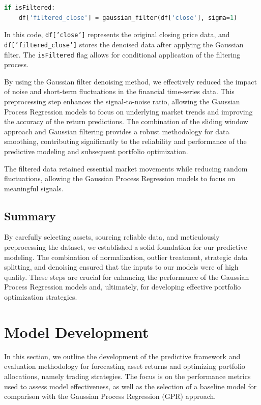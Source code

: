 \begin{lstlisting}[language=Python]
if isFiltered:
    df['filtered_close'] = gaussian_filter(df['close'], sigma=1)
\end{lstlisting}

In this code, \texttt{df['close']} represents the original closing price data, and \texttt{df['filtered\_close']} stores the denoised data after applying the Gaussian filter. The \texttt{isFiltered} flag allows for conditional application of the filtering process.

By using the Gaussian filter denoising method, we effectively reduced the impact of noise and short-term fluctuations in the financial time-series data. This preprocessing step enhances the signal-to-noise ratio, allowing the Gaussian Process Regression models to focus on underlying market trends and improving the accuracy of the return predictions. The combination of the sliding window approach and Gaussian filtering provides a robust methodology for data smoothing, contributing significantly to the reliability and performance of the predictive modeling and subsequent portfolio optimization.

The filtered data retained essential market movements while reducing random fluctuations, allowing the Gaussian Process Regression models to focus on meaningful signals.


\subsection{Summary}

By carefully selecting assets, sourcing reliable data, and meticulously preprocessing the dataset, we established a solid foundation for our predictive modeling. The combination of normalization, outlier treatment, strategic data splitting, and denoising ensured that the inputs to our models were of high quality. These steps are crucial for enhancing the performance of the Gaussian Process Regression models and, ultimately, for developing effective portfolio optimization strategies.



\section{Model Development}
In this section, we outline the development of the predictive framework and evaluation methodology for forecasting asset returns and optimizing portfolio allocations, namely trading strategies. The focus is on the performance metrics used to assess model effectiveness, as well as the selection of a baseline model for comparison with the Gaussian Process Regression (GPR) approach.

